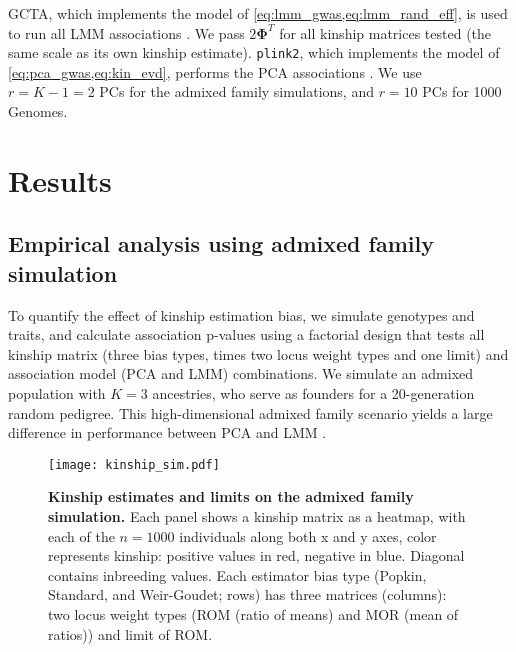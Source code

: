 \documentclass[9pt,twocolumn,twoside]{gsajnl}
\newcommand{\kinMat}[1][T]{\mathbf{\Phi}^{#1}}
\begin{document}
GCTA, which implements the model of \cref{eq:lmm_gwas,eq:lmm_rand_eff}, is used to run all LMM associations \citep{yang_gcta:_2011, yang_advantages_2014}.
We pass $2 \kinMat$ for all kinship matrices tested (the same scale as its own kinship estimate).
\texttt{plink2}, which implements the model of \cref{eq:pca_gwas,eq:kin_evd}, performs the PCA associations \citep{chang_second-generation_2015}.
We use $r = K - 1 = 2$ PCs for the admixed family simulations, and $r = 10$ PCs for 1000 Genomes.

\section{Results}

\subsection{Empirical analysis using admixed family simulation}

To quantify the effect of kinship estimation bias, we simulate genotypes and traits, and calculate association p-values using a factorial design that tests all kinship matrix (three bias types, times two locus weight types and one limit) and association model (PCA and LMM) combinations.
We simulate an admixed population with $K=3$ ancestries, who serve as founders for a 20-generation random pedigree.
This high-dimensional admixed family scenario yields a large difference in performance between PCA and LMM \citep{yao_limitations_2022}.

\begin{figure}[tb]
  \centering
  \texttt{[image: kinship\_sim.pdf]}
  \caption{
    {\bf Kinship estimates and limits on the admixed family simulation.}
    Each panel shows a kinship matrix as a heatmap, with each of the $n=1000$ individuals along both x and y axes, color represents kinship: positive values in red, negative in blue.
    Diagonal contains inbreeding values.
    Each estimator bias type (Popkin, Standard, and Weir-Goudet; rows) has three matrices (columns): two locus weight types (ROM (ratio of means) and MOR (mean of ratios)) and limit of ROM.
  }
  \label{fig:kinship_sim}
\end{figure}
\end{document}

